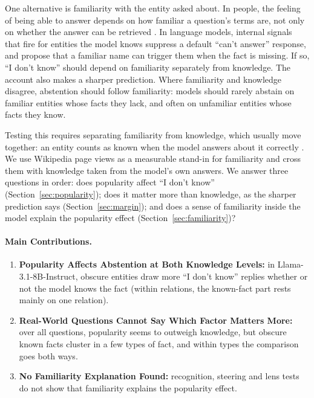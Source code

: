 \documentclass[letterpaper]{article} %
\newcommand{\idk}{``I don't know''}
\begin{document}
One alternative is familiarity with the entity asked about. In people, the feeling of being able to answer depends on how familiar a question's terms are, not only on whether the answer can be retrieved \citep{reder1992feeling,koriat2001combined}. In language models, internal signals that fire for entities the model knows suppress a default ``can't answer'' response, and \citet{lindsey2025biology} propose that a familiar name can trigger them when the fact is missing. If so, \idk{} should depend on familiarity separately from knowledge. The account also makes a sharper prediction. Where familiarity and knowledge disagree, abstention should follow familiarity: models should rarely abstain on familiar entities whose facts they lack, and often on unfamiliar entities whose facts they know.

Testing this requires separating familiarity from knowledge, which usually move together: an entity counts as known when the model answers about it correctly \citep{ferrando2025entity}. We use Wikipedia page views as a measurable stand-in for familiarity and cross them with knowledge taken from the model's own answers. We answer three questions in order: does popularity affect \idk{} (Section~\ref{sec:popularity}); does it matter more than knowledge, as the sharper prediction says (Section~\ref{sec:margin}); and does a sense of familiarity inside the model explain the popularity effect (Section~\ref{sec:familiarity})?

\paragraph{Main Contributions.}
\begin{enumerate}
\item \textbf{Popularity Affects Abstention at Both Knowledge Levels:} in Llama-3.1-8B-Instruct, obscure entities draw more \idk{} replies whether or not the model knows the fact (within relations, the known-fact part rests mainly on one relation).
\item \textbf{Real-World Questions Cannot Say Which Factor Matters More:} over all questions, popularity seems to outweigh knowledge, but obscure known facts cluster in a few types of fact, and within types the comparison goes both ways.
\item \textbf{No Familiarity Explanation Found:} recognition, steering and lens tests do not show that familiarity explains the popularity effect.
\end{enumerate}
\end{document}
